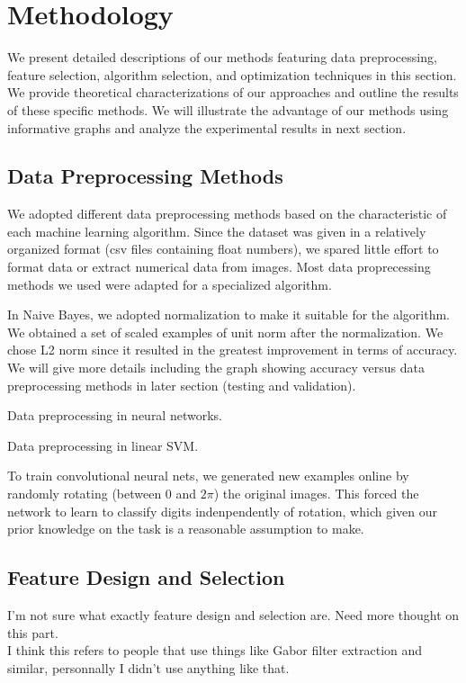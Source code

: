 \documentclass{acm_proc_article-sp}
\begin{document}
\section{Methodology}
We present detailed descriptions of our methods featuring data preprocessing, feature selection, algorithm selection, and optimization techniques in this section.  We provide theoretical characterizations of our approaches and outline the results of these specific methods. We will illustrate the advantage of our methods using informative graphs and analyze the experimental results in next section.


\subsection{Data Preprocessing Methods}
We adopted different data preprocessing methods based on the characteristic of each machine learning algorithm. Since the dataset was given in a relatively organized format (csv files containing float numbers), we spared little effort to format data or extract numerical data from images. Most data proprecessing methods we used were adapted for a specialized algorithm.

In Naive Bayes, we adopted normalization to  make it suitable for the algorithm. We obtained a set of scaled examples of unit norm after the normalization. We chose L2 norm since it resulted in the greatest improvement in terms of accuracy. We will give more details including the graph showing accuracy versus data preprocessing methods in later section (testing and validation).

Data preprocessing in neural networks. 

Data preprocessing in linear SVM.

To train convolutional neural nets, we generated new examples online by randomly rotating (between 0 and $2\pi$) the original images. This forced the network to learn to classify digits indenpendently of rotation, which given our prior knowledge on the task is a reasonable assumption to make.

\subsection{Feature Design and Selection}
I'm not sure what exactly feature design and selection are. Need more thought on this part.\\
I think this refers to people that use things like Gabor filter extraction and similar, personnally I didn't use anything like that.
\end{document}
